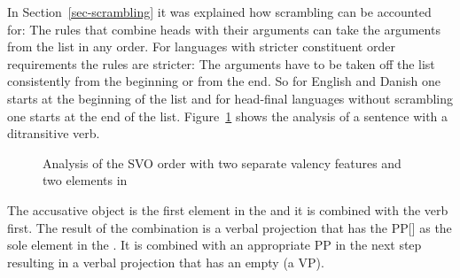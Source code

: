 In Section~\ref{sec-scrambling} it was explained how scrambling can be accounted for: The rules that
combine heads with their arguments can take the arguments from the list in any order. For languages
with stricter constituent order requirements the rules are stricter: The arguments have to be taken
off the list consistently from the beginning or from the end. So for English and Danish one starts
at the beginning of the list and for head-final languages without scrambling one starts at the end
of the list.
Figure~\ref{fig-svo-ditrans} shows the analysis of a sentence with a ditransitive verb.
\begin{figure}
\caption{\label{fig-svo-ditrans}Analysis of the SVO order with two separate valency features and two
  elements in \comps}
\end{figure}
The accusative object is the first element in the \compsl and it is combined with the verb
first. The result of the combination is a verbal projection that has the PP[] as the sole
element in the \compsl. It is combined with an appropriate PP in the next step resulting in a verbal
projection that has an empty \compsl (a VP).


